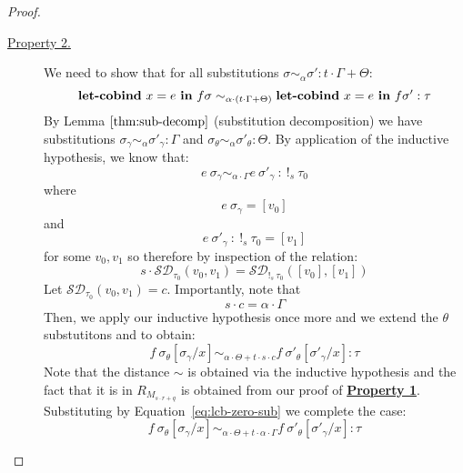 \begin{proof}
\begin{description}
\begin{description}
        \item[\underline{Property 2.}]
          We need to show that for all substitutions $\sigma \sim_{\alpha}
          \sigma' : t \cdot \Gamma + \Theta$:
          $$\textbf{let-cobind}~x = e \ \textbf{in} \ f \sigma \sim_{\alpha \cdot (t
          \cdot \Gamma + \Theta)} \textbf{let-cobind}~x = e \ \textbf{in} \ f \sigma' :
          \tau$$
          By Lemma $\ref{thm:sub-decomp}$ (substitution decomposition) we have
          substitutions 
          $\sigma_{\gamma} \sim_{\alpha} \sigma'_{\gamma} : \Gamma$
          and $\sigma_{\theta} \sim_{\alpha} \sigma'_{\theta} : \Theta$.
          By application of the inductive hypothesis, we know that:
          $$
          e~\sigma_{\gamma} \sim_{\alpha \cdot \Gamma}
          e~\sigma'_{\gamma} \ : \> !_{s}~\tau_0
          $$
          where 
          $$
          e~\sigma_{\gamma} = [v_0]
          $$
          and
          $$
          e~\sigma'_{\gamma} \ : \> !_{s}~\tau_0 = [v_1]
          $$
          for some $v_0, v_1$ so therefore by inspection of the relation:
          $$
          s \cdot \mathcal{SD}_{\tau_0}(v_0, v_1) =  
          \mathcal{SD}_{!_s~\tau_0}([v_0], [v_1])
          $$
          Let $\mathcal{SD}_{\tau_0}(v_0, v_1) = c$. Importantly, note that 
          \begin{equation} \label{eq:lcb-zero-sub}
            s \cdot c = \alpha \cdot \Gamma
          \end{equation}
          Then, we apply our inductive hypothesis once more and we extend the
          $\theta$ substutitons and to obtain:
          $$
          f~\sigma_{\theta}[\sigma_{\gamma}/x] 
          \sim_{\alpha \cdot \Theta + t \cdot s \cdot c}
          f~\sigma'_{\theta}[\sigma'_{\gamma}/x] : \tau
          $$
          Note that the distance $\sim$ is obtained via the inductive hypothesis
          and the fact that it is in $R_{M_{s \cdot r + q}}$ is obtained from
          our proof of \textbf{\underline{Property 1}}.
          Substituting by Equation~\ref{eq:lcb-zero-sub} we complete the case:
          $$
          f~\sigma_{\theta}[\sigma_{\gamma}/x] 
          \sim_{\alpha \cdot \Theta + t \cdot \alpha \cdot \Gamma}
          f~\sigma'_{\theta}[\sigma'_{\gamma}/x] : \tau
          $$
      \end{description}


\end{description}
\end{proof}
